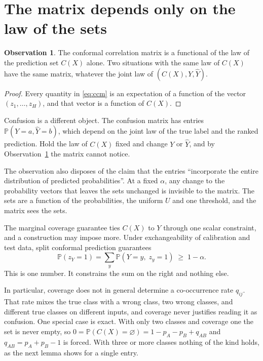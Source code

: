 \documentclass[11pt]{article}
\theoremstyle{definition}
\theoremstyle{definition}
\newtheorem{observation}{Observation}
\theoremstyle{remark}
\newcommand{\Prob}{\mathbb{P}}
\begin{document}
\section{The matrix depends only on the law of the sets}\label{sec:organizing}

\begin{observation}\label{prop:law}
The conformal correlation matrix is a functional of the law of the prediction set $C(X)$ alone.
Two situations with the same law of $C(X)$ have the same matrix, whatever the joint law of $(C(X),
Y, \hat Y)$.
\end{observation}

\begin{proof}
Every quantity in \eqref{eq:ccm} is an expectation of a function of the vector $(z_1, \dots, z_H)$,
and that vector is a function of $C(X)$.
\end{proof}

Confusion is a different object. The confusion matrix has entries $\Prob(Y = a, \hat Y = b)$, which
depend on the joint law of the true label and the ranked prediction. Hold the law of $C(X)$ fixed
and change $Y$ or $\hat Y$, and by Observation~\ref{prop:law} the matrix cannot notice.

The observation also disposes of the claim that the entries ``incorporate the entire distribution
of predicted probabilities''. At a fixed $\alpha$, any change to the probability vectors that leaves
the sets unchanged is invisible to the matrix. The sets are a function of the probabilities, the uniform $U$ and one threshold, and the matrix
sees the sets.

The marginal coverage guarantee ties $C(X)$ to $Y$ through one scalar constraint, and a construction may
impose more. Under exchangeability of calibration and test data, split conformal prediction guarantees
\begin{equation}\label{eq:coverage}
\Prob(z_Y = 1) = \sum_{y} \Prob(Y = y,\; z_y = 1) \;\ge\; 1 - \alpha .
\end{equation}
This is one number. It constrains the sum on the right and nothing else.

In particular, coverage does not in general determine a co-occurrence rate $q_{ij}$. That rate mixes
the true class with a wrong class, two wrong classes, and different true classes on different
inputs, and coverage never justifies reading it as confusion. One special case is exact. With only two classes and coverage one the set is never empty, so
$0 = \Prob(C(X) = \varnothing) = 1 - p_A - p_B + q_{AB}$ and $q_{AB} = p_A + p_B - 1$ is forced. With
three or more classes nothing of the kind holds, as the next lemma shows for a single entry.
\end{document}
